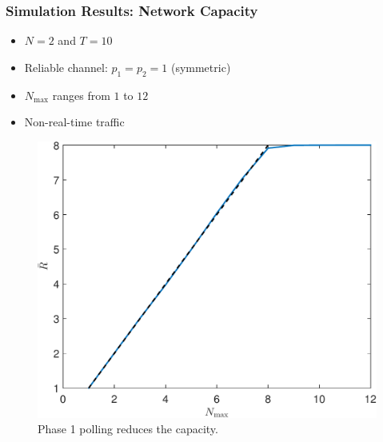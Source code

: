 \documentclass{beamer}
\begin{document}
\begin{frame}
\frametitle{Simulation Results: Network Capacity}
\begin{itemize}
\item $N=2$ and $T=10$
\item Reliable channel: $p_1 = p_2 = 1$ (symmetric)
\item $N_\text{max}$ ranges from $1$ to $12$
\item Non-real-time traffic
\end{itemize}
\begin{figure}
\centering
\includegraphics[height=.5\textheight]{nonrealtime_throughput_randmax.pdf}
\caption{Phase 1 polling reduces the capacity.}
\end{figure}
\end{frame}
\end{document}

